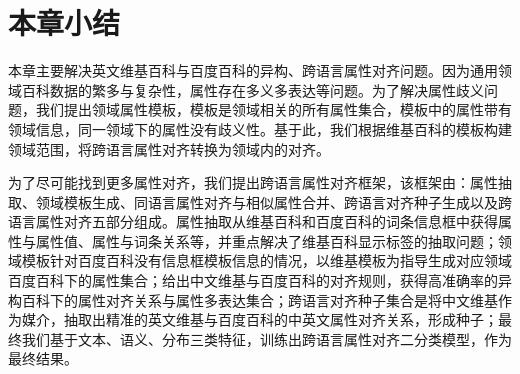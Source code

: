 \section{本章小结}
本章主要解决英文维基百科与百度百科的异构、跨语言属性对齐问题。因为通用领域百科数据的繁多与复杂性，属性存在多义多表达等问题。为了解决属性歧义问题，我们提出领域属性模板，模板是领域相关的所有属性集合，模板中的属性带有领域信息，同一领域下的属性没有歧义性。基于此，我们根据维基百科的模板构建领域范围，将跨语言属性对齐转换为领域内的对齐。

为了尽可能找到更多属性对齐，我们提出跨语言属性对齐框架，该框架由：属性抽取、领域模板生成、同语言属性对齐与相似属性合并、跨语言对齐种子生成以及跨语言属性对齐五部分组成。属性抽取从维基百科和百度百科的词条信息框中获得属性与属性值、属性与词条关系等，并重点解决了维基百科显示标签的抽取问题；领域模板针对百度百科没有信息框模板信息的情况，以维基模板为指导生成对应领域百度百科下的属性集合；给出中文维基与百度百科的对齐规则，获得高准确率的异构百科下的属性对齐关系与属性多表达集合；跨语言对齐种子集合是将中文维基作为媒介，抽取出精准的英文维基与百度百科的中英文属性对齐关系，形成种子；最终我们基于文本、语义、分布三类特征，训练出跨语言属性对齐二分类模型，作为最终结果。

